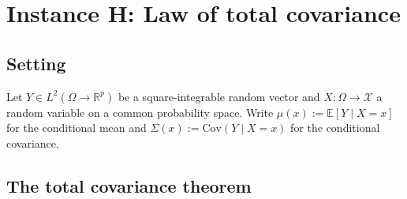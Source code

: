\documentclass[11pt,a4paper]{article}
\numberwithin{equation}{section}
\newcommand{\R}{\mathbb{R}}
\theoremstyle{thmcompact}
\theoremstyle{remark}
\begin{document}
\section{Instance H: Law of total covariance}
\label{sec:bridge-H}

\subsection{Setting}

Let $Y \in L^2(\Omega \to \R^p)$ be a square-integrable random vector and $X: \Omega \to \mathcal{X}$ a random variable on a common probability space. Write $\mu(x) := \mathbb{E}[Y \mid X = x]$ for the conditional mean and $\Sigma(x) := \mathrm{Cov}(Y \mid X = x)$ for the conditional covariance.

\subsection{The total covariance theorem}
\end{document}
